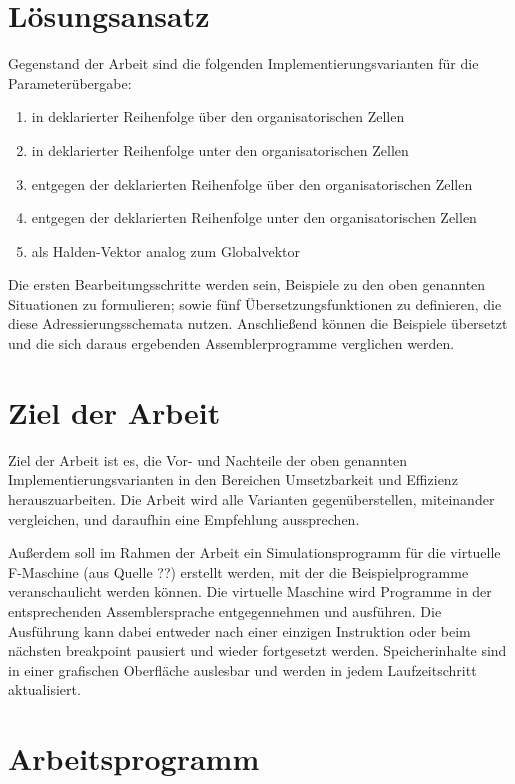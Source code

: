 \documentclass[a4paper,twoside,11pt]{article}
\begin{document}
\section{Lösungsansatz}

Gegenstand der Arbeit sind die folgenden Implementierungsvarianten für die Parameterübergabe:

\begin{enumerate}
\item in deklarierter Reihenfolge über den organisatorischen Zellen
\item in deklarierter Reihenfolge unter den organisatorischen Zellen
\item entgegen der deklarierten Reihenfolge über den organisatorischen Zellen
\item entgegen der deklarierten Reihenfolge unter den organisatorischen Zellen
\item als Halden-Vektor analog zum Globalvektor
\end{enumerate}

Die ersten Bearbeitungsschritte werden sein, Beispiele zu den oben genannten Situationen zu formulieren; sowie fünf Übersetzungsfunktionen zu definieren, die diese Adressierungsschemata nutzen. Anschließend können die Beispiele übersetzt und die sich daraus ergebenden Assemblerprogramme verglichen werden.


\section{Ziel der Arbeit}

Ziel der Arbeit ist es, die Vor- und Nachteile der oben genannten Implementierungsvarianten in den Bereichen Umsetzbarkeit und Effizienz herauszuarbeiten. Die Arbeit wird alle Varianten gegenüberstellen, miteinander vergleichen, und daraufhin eine Empfehlung aussprechen.

Außerdem soll im Rahmen der Arbeit ein Simulationsprogramm für die virtuelle F-Maschine (aus Quelle ??) erstellt werden, mit der die Beispielprogramme veranschaulicht werden können. Die virtuelle Maschine wird Programme in der entsprechenden Assemblersprache entgegennehmen und ausführen. Die Ausführung kann dabei entweder nach einer einzigen Instruktion oder beim nächsten breakpoint pausiert und wieder fortgesetzt werden. Speicherinhalte sind in einer grafischen Oberfläche auslesbar und werden  in jedem Laufzeitschritt aktualisiert.

\newpage
\section{Arbeitsprogramm}
\end{document}
